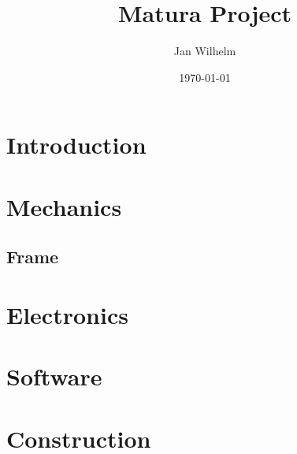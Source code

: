\documentclass[11pt]{report}
\title{Matura Project}
\author{Jan Wilhelm}
\date\today
\begin{document}
    \maketitle

    \tableofcontents
    \newpage


    \chapter{Introduction}\label{ch:introduction}
    

    \chapter{Mechanics}\label{ch:mechanics}


    \section{Frame}\label{sec:frame}


    \chapter{Electronics}\label{ch:electronics}


    \chapter{Software}\label{ch:software}


    \chapter{Construction}\label{ch:construction}
\end{document}
